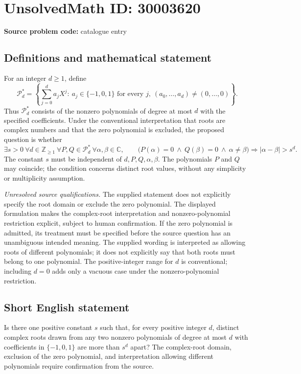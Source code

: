 \documentclass[11pt]{article}
\newcommand{\Z}{\mathbb{Z}}
\newcommand{\C}{\mathbb{C}}
\begin{document}
\section*{UnsolvedMath ID: 30003620}
\textbf{Source problem code:} catalogue entry
\subsection{Definitions and mathematical statement}
For an integer \(d\geq 1\), define
\[
\mathcal P_d^{\ast}=\left\{\sum_{j=0}^{d}a_jX^j:\ a_j\in\{-1,0,1\}\text{ for every }j,\ (a_0,\ldots,a_d)\neq(0,\ldots,0)\right\}.
\]
Thus \(\mathcal P_d^{\ast}\) consists of the nonzero polynomials of degree at most \(d\) with the specified coefficients. Under the conventional interpretation that roots are complex numbers and that the zero polynomial is excluded, the proposed question is whether
\[
\exists s>0\ \forall d\in\Z_{\geq1}\ \forall P,Q\in\mathcal P_d^{\ast}\ \forall\alpha,\beta\in\C,
\qquad
\bigl(P(\alpha)=0\ \land\ Q(\beta)=0\ \land\ \alpha\neq\beta\bigr)
\Longrightarrow |\alpha-\beta|>s^d.
\]
The constant \(s\) must be independent of \(d,P,Q,\alpha,\beta\). The polynomials \(P\) and \(Q\) may coincide; the condition concerns distinct root values, without any simplicity or multiplicity assumption.

\textit{Unresolved source qualifications.} The supplied statement does not explicitly specify the root domain or exclude the zero polynomial. The displayed formulation makes the complex-root interpretation and nonzero-polynomial restriction explicit, subject to human confirmation. If the zero polynomial is admitted, its treatment must be specified before the source question has an unambiguous intended meaning. The supplied wording is interpreted as allowing roots of different polynomials; it does not explicitly say that both roots must belong to one polynomial. The positive-integer range for \(d\) is conventional; including \(d=0\) adds only a vacuous case under the nonzero-polynomial restriction.
\subsection{Short English statement}
Is there one positive constant \(s\) such that, for every positive integer \(d\), distinct complex roots drawn from any two nonzero polynomials of degree at most \(d\) with coefficients in \(\{-1,0,1\}\) are more than \(s^d\) apart? The complex-root domain, exclusion of the zero polynomial, and interpretation allowing different polynomials require confirmation from the source.
\end{document}
